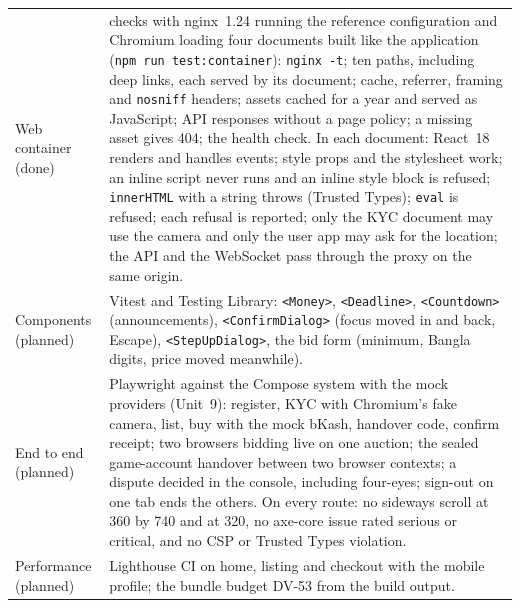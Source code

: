 \documentclass[11pt,a4paper]{article}
\newenvironment{dtable}[1]{\small\begin{longtable}{#1}}{\end{longtable}}
\begin{document}
\begin{dtable}{@{}>{\raggedright\arraybackslash}p{3.2cm}>{\raggedright\arraybackslash}p{12cm}@{}}
Web container (done) & 25 checks with nginx~1.24 running the reference configuration and Chromium loading four documents built like the application (\texttt{npm run test:container}): \texttt{nginx -t}; ten paths, including deep links, each served by its document; cache, referrer, framing and \texttt{nosniff} headers; assets cached for a year and served as JavaScript; API responses without a page policy; a missing asset gives 404; the health check. In each document: React~18 renders and handles events; style props and the stylesheet work; an inline script never runs and an inline style block is refused; \texttt{innerHTML} with a string throws (Trusted Types); \texttt{eval} is refused; each refusal is reported; only the KYC document may use the camera and only the user app may ask for the location; the API and the WebSocket pass through the proxy on the same origin. \\
Components (planned) & Vitest and Testing Library: \texttt{<Money>}, \texttt{<Deadline>}, \texttt{<Countdown>} (announcements), \texttt{<ConfirmDialog>} (focus moved in and back, Escape), \texttt{<StepUpDialog>}, the bid form (minimum, Bangla digits, price moved meanwhile). \\
End to end (planned) & Playwright against the Compose system with the mock providers (Unit~9): register, KYC with Chromium's fake camera, list, buy with the mock bKash, handover code, confirm receipt; two browsers bidding live on one auction; the sealed game-account handover between two browser contexts; a dispute decided in the console, including four-eyes; sign-out on one tab ends the others. On every route: no sideways scroll at 360 by 740 and at 320, no axe-core issue rated serious or critical, and no CSP or Trusted Types violation. \\
Performance (planned) & Lighthouse CI on home, listing and checkout with the mobile profile; the bundle budget DV-53 from the build output. \\
\bottomrule
\end{dtable}
\end{document}

